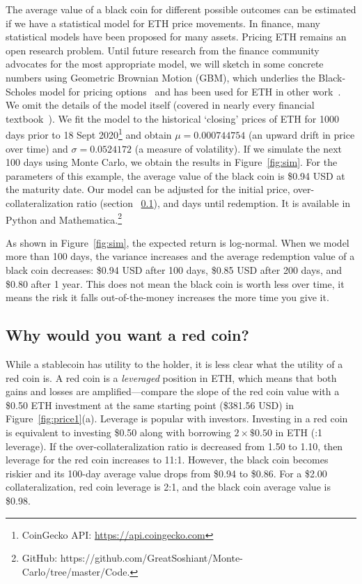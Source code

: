 The average value of a black coin for different possible outcomes can be estimated if we have a statistical model for ETH price movements. In finance, many statistical models have been proposed for many assets. Pricing ETH remains an open research problem. Until future research from the finance community advocates for the most appropriate model, we will sketch in some concrete numbers using Geometric Brownian Motion (GBM), which underlies the Black-Scholes model for pricing options~\cite{BS73} and has been used for ETH in other work~\cite{GPH+20}. We omit the details of the model itself (covered in nearly every  financial textbook~\cite{Sey09}). We fit the model to the historical `closing' prices of ETH for 1000 days prior to 18 Sept 2020\footnote{CoinGecko API: \url{https://api.coingecko.com}} and obtain $\mu=0.000744754$ (an upward drift in price over time) and $\sigma=0.0524172$ (a measure of volatility). If we simulate the next 100 days using Monte Carlo, we obtain the results in Figure~\ref{fig:sim}. For the parameters of this example, the average value of the black coin is \$0.94 USD at the maturity date. Our model can be adjusted for the initial price, over-collateralization ratio (section ~\ref{sec:redchar}), and days until redemption. It is available in Python and Mathematica.\footnote{GitHub: https://github.com/GreatSoshiant/Monte-Carlo/tree/master/Code.} 

As shown in Figure~\ref{fig:sim}, the expected return is log-normal. When we model more than 100 days, the variance increases and the average redemption value of a black coin decreases: \$0.94 USD after 100 days, \$0.85 USD after 200 days, and \$0.80 after 1 year. This does not mean the black coin is worth less over time, it means the risk it falls out-of-the-money increases the more time you give it. 


\subsection{Why would you want a red coin?}
\label{sec:redchar}

While a stablecoin has utility to the holder, it is less clear what the utility of a red coin is. A red coin is a \textit{leveraged} position in ETH, which means that both gains and losses are amplified---compare the slope of the red coin value with a \$0.50 ETH investment at the same starting point (\$381.56 USD) in Figure~\ref{fig:price1}(a). Leverage is popular with investors. Investing in a red coin is equivalent to investing \$0.50 along with borrowing $2\times\$0.50$ in ETH (:1 leverage). If the over-collateralization ratio is decreased from 1.50 to 1.10, then leverage for the red coin increases to 11:1. However, the black coin becomes riskier and its 100-day average value drops from \$0.94 to \$0.86. For a \$2.00 collateralization, red coin leverage is 2:1, and the black coin average value is \$0.98. 


